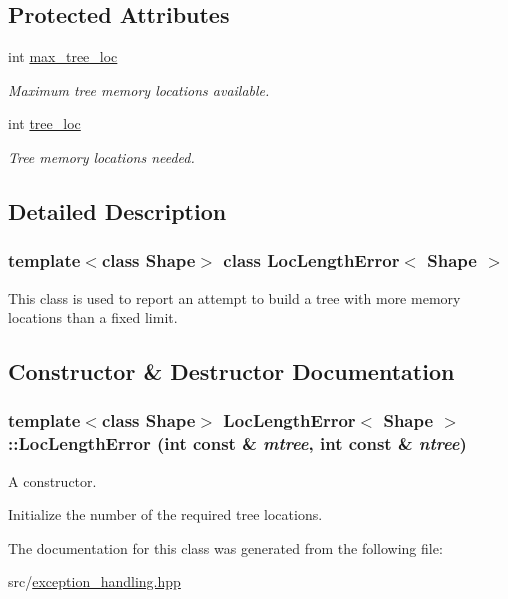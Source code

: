 \subsection*{Protected Attributes}
\begin{DoxyCompactItemize}
\item 
\hypertarget{classLocLengthError_aae1abb4777cbb5be258a7349ff1cc30f}{
int \hyperlink{classLocLengthError_aae1abb4777cbb5be258a7349ff1cc30f}{max\_\-tree\_\-loc}}
\label{classLocLengthError_aae1abb4777cbb5be258a7349ff1cc30f}

\begin{DoxyCompactList}\small\item\em Maximum tree memory locations available. \item\end{DoxyCompactList}\item 
\hypertarget{classLocLengthError_afe2db13de26663e929ecf1ed2839adef}{
int \hyperlink{classLocLengthError_afe2db13de26663e929ecf1ed2839adef}{tree\_\-loc}}
\label{classLocLengthError_afe2db13de26663e929ecf1ed2839adef}

\begin{DoxyCompactList}\small\item\em Tree memory locations needed. \item\end{DoxyCompactList}\end{DoxyCompactItemize}


\subsection{Detailed Description}
\subsubsection*{template$<$class Shape$>$ class LocLengthError$<$ Shape $>$}

This class is used to report an attempt to build a tree with more memory locations than a fixed limit. 

\subsection{Constructor \& Destructor Documentation}
\hypertarget{classLocLengthError_aa99b1f424fc5d9a081269f99ea239230}{
\subsubsection[{LocLengthError}]{\setlength{\rightskip}{0pt plus 5cm}template$<$class Shape$>$ {\bf LocLengthError}$<$ Shape $>$::{\bf LocLengthError} (int const \& {\em mtree}, \/  int const \& {\em ntree})}}
\label{classLocLengthError_aa99b1f424fc5d9a081269f99ea239230}
A constructor.

Initialize the number of the required tree locations. 

The documentation for this class was generated from the following file:\begin{DoxyCompactItemize}
\item 
src/\hyperlink{exception__handling_8hpp}{exception\_\-handling.hpp}\end{DoxyCompactItemize}
